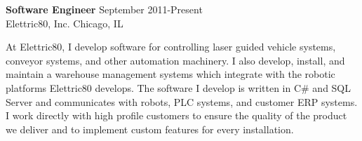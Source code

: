\textbf{Software Engineer} \hfill September 2011-Present \\
Elettric80, Inc. \hfill Chicago, IL
\begin{description}  \itemsep -2pt %
\item At Elettric80, I develop software for controlling laser guided
vehicle systems, conveyor systems, and other automation machinery. I also
develop, install, and maintain a warehouse management systems which
integrate with the robotic platforms Elettric80 develops. The software I
develop is written in C\# and SQL Server and communicates with robots, PLC
systems, and customer ERP systems. I work directly with high profile
customers to ensure the quality of the product we deliver and to implement
custom features for every installation.
\end{description}
